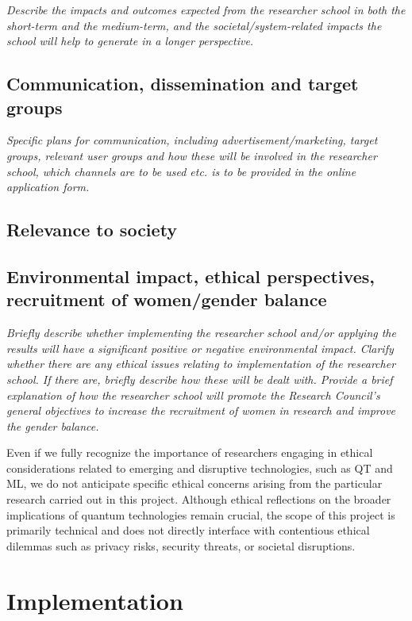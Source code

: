 \documentclass{scrreprt}
\begin{document}
{\em Describe the impacts and outcomes expected from the researcher school
in both the short-term and the medium-term, and the
societal/system-related impacts the school will help to generate in a
longer perspective.}

\subsection{Communication, dissemination and target groups}

{\em Specific plans for communication, including advertisement/marketing,
target groups, relevant user groups and how these will be involved in
the researcher school, which channels are to be used etc. is to be
provided in the online application form.}

\subsection{Relevance to society}


\subsection{Environmental impact, ethical perspectives, recruitment of women/gender balance }

{\em Briefly describe whether implementing the researcher school and/or applying the results will have a significant positive or negative environmental impact. Clarify whether there are any ethical issues relating to implementation of the researcher school. If there are, briefly describe how these will be dealt with. Provide a brief explanation of how the researcher school will promote the Research Council’s general objectives to increase the recruitment of women in research and improve the gender balance.}



Even if we fully recognize the importance of researchers engaging in
ethical considerations related to emerging and disruptive
technologies, such as QT and ML, we do not anticipate specific ethical
concerns arising from the particular research carried out in this
project. Although ethical reflections on the broader implications of
quantum technologies remain crucial, the scope of this project is
primarily technical and does not directly interface with contentious
ethical dilemmas such as privacy risks, security threats, or societal
disruptions.



\section{Implementation}
\end{document}
